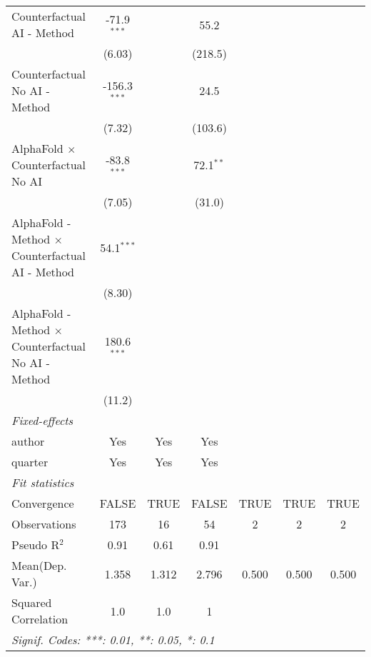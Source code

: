 \begin{tabular}{lcccccc}
   Counterfactual AI - Method                                 & -71.9$^{***}$  &         & 55.2        &      &      &   \\   
                                                              & (6.03)         &         & (218.5)     &      &      &   \\   
   Counterfactual No AI - Method                              & -156.3$^{***}$ &         & 24.5        &      &      &   \\   
                                                              & (7.32)         &         & (103.6)     &      &      &   \\   
   AlphaFold $\times$ Counterfactual No AI                    & -83.8$^{***}$  &         & 72.1$^{**}$ &      &      &   \\   
                                                              & (7.05)         &         & (31.0)      &      &      &   \\   
   AlphaFold - Method $\times$ Counterfactual AI - Method     & 54.1$^{***}$   &         &             &      &      &   \\   
                                                              & (8.30)         &         &             &      &      &   \\   
   AlphaFold - Method $\times$ Counterfactual No AI - Method  & 180.6$^{***}$  &         &             &      &      &   \\   
                                                              & (11.2)         &         &             &      &      &   \\   
   \midrule
   \emph{Fixed-effects}\\
   author                                                     & Yes            & Yes     & Yes         &      &      & \\  
   quarter                                                    & Yes            & Yes     & Yes         &      &      & \\  
   \midrule
   \emph{Fit statistics}\\
   Convergence                                                &FALSE           & TRUE    & FALSE       & TRUE & TRUE & TRUE\\  
   Observations                                               & 173            & 16      & 54          & 2    & 2    & 2\\  
   Pseudo R$^2$                                               & 0.91           & 0.61    & 0.91        &      &      & \\  
Mean(Dep. Var.) & 1.358 & 1.312 & 2.796 & 0.500 & 0.500 & 0.500 \\
   Squared Correlation                                        & 1.0            & 1.0     & 1           &      &      & \\  
   \midrule \midrule
   \multicolumn{7}{l}{\emph{Signif. Codes: ***: 0.01, **: 0.05, *: 0.1}}\\
\end{tabular}
\par\endgroup
